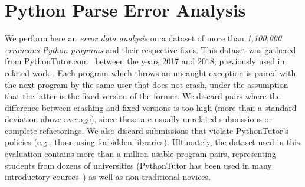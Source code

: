 \section{Python Parse Error Analysis}
\label{sec:error-analysis}

We perform here an \emph{error data analysis} on a \python dataset of more than
\emph{1,100,000 erroneous Python programs} and their respective fixes. This
dataset was gathered from PythonTutor.com~\citep{Guo2013} between the years 2017
and 2018, previously used in related work \citep{Endres2019, Cosman2020}. Each
program which throws an uncaught \python exception is paired with the next
program by the same user that does not crash, under the assumption that the
latter is the fixed version of the former. We discard pairs where the difference
between crashing and fixed versions is too high (more than a standard deviation
above average), since these are usually unrelated submissions or complete
refactorings. We also discard submissions that violate PythonTutor's policies
(e.g., those using forbidden libraries). Ultimately, the dataset used in this
evaluation contains more than a million usable program pairs, representing
students from dozens of universities (PythonTutor has been used in many
introductory courses~\citep{Guo2013}) as well as non-traditional novices.


